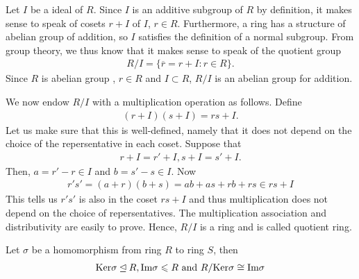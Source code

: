 Let $I$ be a ideal of $R$. Since $I$ is an additive subgroup of $R$ by definition, it makes sense to speak of cosets $r+I$ of $I$, $r\in R$. 
Furthermore, a ring has a structure of abelian group of addition, 
so $I$ satisfies the definition of a normal subgroup. From group theory, we thus know that it makes sense to speak of the quotient group
\begin{align*}
    R/I = \{\overline{r} = r+I:r\in R\}.
\end{align*}
Since $R$ is abelian group , $r\in R$ and $I\subset R$, $R/I$ is an abelian group for addition.
\par
We now endow $R/I$ with a multiplication operation as follows. Define
\begin{align*}
    (r+I)(s+I) = rs + I.
\end{align*}
Let us make sure that this is well-defined, namely that it does not depend on the choice of the repersentative in each coset. Suppose that
\begin{align*}
    r+I=r'+I, s+I=s'+I.
\end{align*}
Then, $a=r'-r\in I$ and $b=s'-s\in I$. Now
\begin{align*}
    r's' = (a+r)(b+s) =ab+as+rb+rs\in rs+I
\end{align*}
This tells us $r's'$ is also in the coset $rs+I$ and thus multiplication does not depend on the choice of repersentatives.
The multiplication association and distributivity are easily to prove. 
Hence, $R/I$ is a ring and is called quotient ring.



\begin{theorem}{}{}
    Let $\sigma$ be a homomorphism from ring $R$ to ring $S$, then
    \begin{align*}
        \text{Ker}\sigma \unlhd R, \text{Im}\sigma \leqslant R\text{ and } R/\text{Ker}\sigma \cong \text{Im}\sigma
    \end{align*}
\end{theorem}

